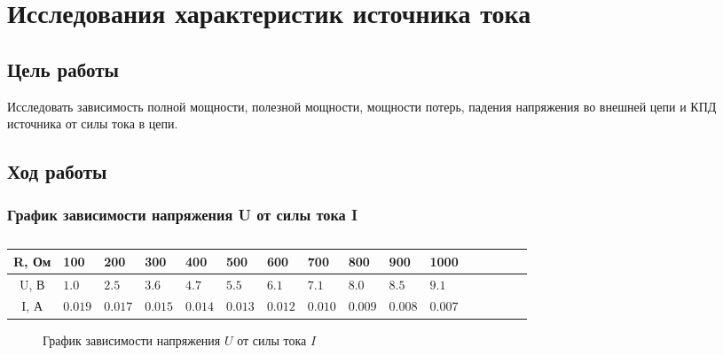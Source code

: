 \chapter{Исследования характеристик источника тока}

\section{Цель работы}

Исследовать зависимость полной мощности, полезной мощности, мощности потерь, падения напряжения во внешней цепи и КПД источника от силы тока в цепи.

\section{Ход работы}

\subsection{График зависимости напряжения U от силы тока I}

\begin{table}[h]
	\caption{}
	\begin{tabularx}{\textwidth}{|c|X|X|X|X|X|X|X|X|X|X|X|X|X|X|X|}
		\hline
		R, Ом & 100 & 200 & 300 & 400 & 500 & 600 & 700 & 800 & 900 & 1000 \\ \hline
		U, В & $1.0$ & $2.5$ & $3.6$ & $4.7$ & $5.5$ & $6.1$ & $7.1$ & $8.0$ & $8.5$ & $9.1$ \\ \hline
		I, А & $0.019$ & $0.017$ & $0.015$ & $0.014$ & $0.013$ & $0.012$ & $0.010$ & $0.009$ & $0.008$ & $0.007$ \\ \hline
	\end{tabularx}
\end{table}

\begin{figure}[h]
	\centering
	\caption{График зависимости напряжения $U$ от силы тока $I$}
\end{figure}

